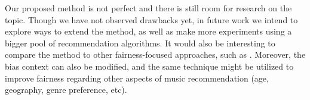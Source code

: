 \documentclass{article}
\begin{document}
Our proposed method is not perfect and there is still 
room for research on the topic. Though we have not
observed drawbacks yet, in future work we
intend to explore ways to extend the method, 
as well as make more experiments using a bigger pool of 
recommendation algorithms. It would also be interesting
to compare the method to other fairness-focused 
approaches, such as \cite{wang2016multi}.
Moreover, the bias 
context can also be modified, and the same technique
might be utilized to improve fairness regarding 
other aspects of music recommendation 
(age, geography, genre preference, etc).  






%
%
%
%
\end{document}

